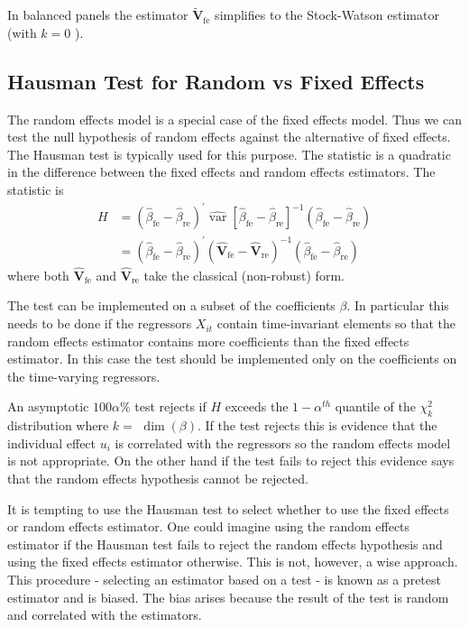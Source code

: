 \documentclass[10pt]{article}
\begin{document}
In balanced panels the estimator $\widetilde{\boldsymbol{V}}_{\mathrm{fe}}$ simplifies to the Stock-Watson estimator (with $k=0$ ).

\subsection{Hausman Test for Random vs Fixed Effects}
The random effects model is a special case of the fixed effects model. Thus we can test the null hypothesis of random effects against the alternative of fixed effects. The Hausman test is typically used for this purpose. The statistic is a quadratic in the difference between the fixed effects and random effects estimators. The statistic is
$$
\begin{aligned}
H &=\left(\widehat{\beta}_{\mathrm{fe}}-\widehat{\beta}_{\mathrm{re}}\right)^{\prime} \widehat{\operatorname{var}}\left[\widehat{\beta}_{\mathrm{fe}}-\widehat{\beta}_{\mathrm{re}}\right]^{-1}\left(\widehat{\beta}_{\mathrm{fe}}-\widehat{\beta}_{\mathrm{re}}\right) \\
&=\left(\widehat{\beta}_{\mathrm{fe}}-\widehat{\beta}_{\mathrm{re}}\right)^{\prime}\left(\widehat{\boldsymbol{V}}_{\mathrm{fe}}-\widehat{\boldsymbol{V}}_{\mathrm{re}}\right)^{-1}\left(\widehat{\beta}_{\mathrm{fe}}-\widehat{\beta}_{\mathrm{re}}\right)
\end{aligned}
$$
where both $\widehat{\boldsymbol{V}}_{\mathrm{fe}}$ and $\widehat{\boldsymbol{V}}_{\mathrm{re}}$ take the classical (non-robust) form.

The test can be implemented on a subset of the coefficients $\beta$. In particular this needs to be done if the regressors $X_{i t}$ contain time-invariant elements so that the random effects estimator contains more coefficients than the fixed effects estimator. In this case the test should be implemented only on the coefficients on the time-varying regressors.

An asymptotic $100 \alpha \%$ test rejects if $H$ exceeds the $1-\alpha^{t h}$ quantile of the $\chi_{k}^{2}$ distribution where $k=$ $\operatorname{dim}(\beta)$. If the test rejects this is evidence that the individual effect $u_{i}$ is correlated with the regressors so the random effects model is not appropriate. On the other hand if the test fails to reject this evidence says that the random effects hypothesis cannot be rejected.

It is tempting to use the Hausman test to select whether to use the fixed effects or random effects estimator. One could imagine using the random effects estimator if the Hausman test fails to reject the random effects hypothesis and using the fixed effects estimator otherwise. This is not, however, a wise approach. This procedure - selecting an estimator based on a test - is known as a pretest estimator and is biased. The bias arises because the result of the test is random and correlated with the estimators.
\end{document}
